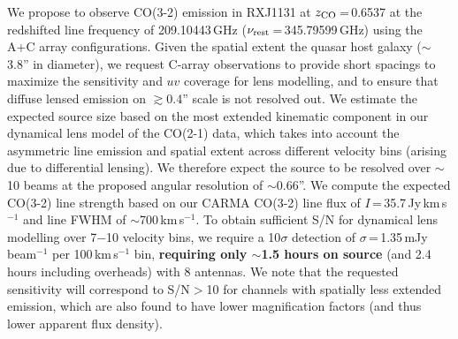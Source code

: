 \documentclass[11pt,a4paper,twoside,graphicx,color]{article}
\newcommand{\bco}{\mbox{CO(2-1)}\xspace}
\newcommand{\cco}{\mbox{CO(3-2)}\xspace}
\newcommand{\kms}{km\,s$^{-1}$\xspace}
\newcommand{\pmOne}{\mbox{$^{-1}$}\xspace}
\newcommand{\eq}{\,=\,}
\newcommand{\obs}{observations\xspace}
\begin{document}
\vspace{.2em}
We propose to observe \cco emission in RXJ1131 at $z_{\rm CO}$\eq0.6537 at the
redshifted line frequency of 209.10443\,GHz ($\nu_{\rm rest}$\eq345.79599\,GHz) using the A+C array configurations.
Given the spatial extent the quasar host galaxy ($\sim$3.8'' in diameter),
we request C-array \obs to provide short spacings
to maximize the sensitivity and $uv$ coverage for lens modelling, and to
ensure that diffuse lensed emission on $\gtrsim$0.4'' scale is not resolved out. %
We estimate the expected source size based on the
most extended kinematic component in our dynamical lens model of the \bco data, which takes into account the asymmetric line emission and spatial extent across different velocity bins (arising due to differential lensing).
We therefore expect the source to be resolved over $\sim$10 beams at the proposed angular resolution of $\sim$0.66''.
We compute the expected \cco line strength based on our
CARMA \cco line flux of $I$\eq35.7\,Jy\,\kms and line FWHM of $\sim$700\,\kms.
To obtain sufficient S/N for dynamical lens modelling over 7$-$10 velocity bins,
we require a 10$\sigma$ detection of $\sigma$\eq1.35\,mJy\,beam\pmOne per 100\,\kms bin,
{\bf requiring only $\sim$1.5 hours on source} (and 2.4 hours including overheads) with 8 antennas.
We note that the requested sensitivity will correspond to S/N$>$10 for channels with spatially less extended emission, which are also found to have lower magnification factors (and thus lower apparent flux density).

\clearpage
\end{document}
